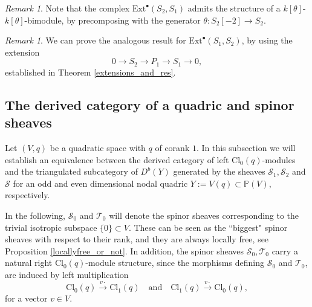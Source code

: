 \documentclass[a4paper, twoside, 11pt]{amsart}
\theoremstyle{definition}
\theoremstyle{remark}
\newtheorem{remark}[theorem]{Remark}
\numberwithin{equation}{theorem}
\newcommand{\evencl}{\mathrm{Cl}_0}
\newcommand{\oddcl}{\mathrm{Cl}_1}
\begin{document}
\begin{remark}\label{k_theta_k_theta_bimodule_str}
    Note that the complex $\mathrm{Ext}^{\bullet}(S_2,S_1)$ admits the structure of a $k[\theta]$-$k[\theta]$-bimodule, by precomposing with the generator  $\theta\colon S_2[-2] \to S_2$. 
\end{remark}
\begin{remark}\label{module_str_other}
    We can prove the analogous result for $\mathrm{Ext}^{\bullet}(S_1, S_2)$, by using the extension 
    \begin{equation}
        0 \longrightarrow S_2 \longrightarrow P_1 \longrightarrow S_1 \longrightarrow 0,
    \end{equation}
    established in Theorem \ref{extensions_and_res}.
\end{remark}
\subsection{The derived category of a quadric and spinor sheaves}\label{derived_spinor}
Let $(V,q)$ be a quadratic space with $q$ of corank $1$. In this subsection we will establish an equivalence between the derived category of left $\evencl(q)$-modules and the triangulated subcategory of $D^b(Y)$ generated by the sheaves $\mathcal{S}_1,\mathcal{S}_2$ and $\mathcal{S}$ for an odd and even dimensional nodal quadric $Y := V(q) \subset \mathbb{P}(V)$, respectively. 

In the following, $\mathcal{S}_0$ and $\mathcal{T}_0$ will denote the spinor sheaves corresponding to the trivial isotropic subspace $\{0\}\subset V$. These can be seen as the ``biggest" spinor sheaves with respect to their rank, and they are always locally free, see Proposition \ref{locallyfree_or_not}. In addition, the spinor sheaves $\mathcal{S}_0,\mathcal{T}_0$ carry a natural right $\evencl(q)$-module structure, since the morphisms defining $\mathcal{S}_0$ and $\mathcal{T}_0$, are induced by left multiplication
    \begin{equation*}
        \evencl(q) \overset{v\cdot}{\longrightarrow} \oddcl(q) \quad \text{and} \quad \oddcl(q) \overset{v\cdot}{\longrightarrow} \evencl(q),
    \end{equation*}
for a vector $v\in V$.
\end{document}
